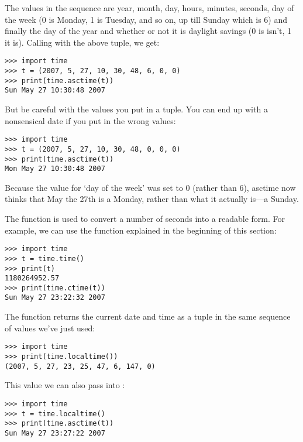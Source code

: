 \noindent
The values in the sequence are year, month, day, hours, minutes, seconds, day of the week (0 is Monday, 1 is Tuesday, and so on, up till Sunday which is 6) and finally the day of the year and whether or not it is daylight savings (0 is isn't, 1 it is). Calling  with the above tuple, we get:

\begin{Verbatim}[frame=single]
>>> import time
>>> t = (2007, 5, 27, 10, 30, 48, 6, 0, 0)
>>> print(time.asctime(t))
Sun May 27 10:30:48 2007
\end{Verbatim}

\noindent
But be careful with the values you put in a tuple. You can end up with a nonsensical date if you put in the wrong values:

\begin{Verbatim}[frame=single]
>>> import time
>>> t = (2007, 5, 27, 10, 30, 48, 0, 0, 0)
>>> print(time.asctime(t))
Mon May 27 10:30:48 2007
\end{Verbatim}

\noindent
Because the value for `day of the week' was set to 0 (rather than 6), asctime now thinks that May the 27th is a Monday, rather than what it actually is---a Sunday.

The function  is used to convert a number of seconds into a readable form.  For example, we can use the  function explained in the beginning of this section:

\begin{Verbatim}[frame=single]
>>> import time
>>> t = time.time()
>>> print(t)
1180264952.57
>>> print(time.ctime(t))
Sun May 27 23:22:32 2007
\end{Verbatim}

\noindent
The function  returns the current date and time as a tuple in the same sequence of values we've just used:

\begin{Verbatim}[frame=single]
>>> import time
>>> print(time.localtime())
(2007, 5, 27, 23, 25, 47, 6, 147, 0)
\end{Verbatim}

\noindent
This value we can also pass into :

\begin{Verbatim}[frame=single]
>>> import time
>>> t = time.localtime()
>>> print(time.asctime(t))
Sun May 27 23:27:22 2007
\end{Verbatim}

